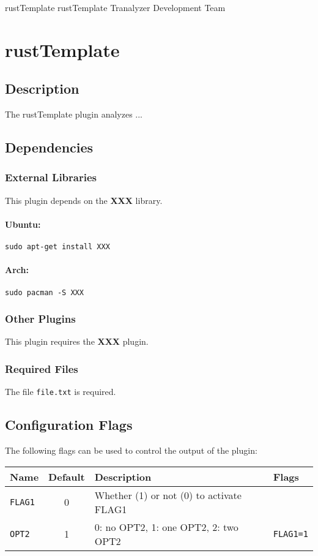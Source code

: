 \documentclass[documentation]{subfiles}
\begin{document}
\trantitle
    {rustTemplate} %
    {rustTemplate} %
    {Tranalyzer Development Team} %

\section{rustTemplate}\label{s:rustTemplate}

\subsection{Description}
The rustTemplate plugin analyzes ...

\subsection{Dependencies}



\subsubsection{External Libraries}
This plugin depends on the {\bf XXX} library.
\paragraph{Ubuntu:} {\tt sudo apt-get install XXX}
\paragraph{Arch:} {\tt sudo pacman -S XXX}

\subsubsection{Other Plugins}
This plugin requires the {\bf XXX} plugin.

\subsubsection{Required Files}
The file {\tt file.txt} is required.

\subsection{Configuration Flags}
The following flags can be used to control the output of the plugin:
\begin{longtable}{lcll}
    {\bf Name} & {\bf Default} & {\bf Description} & {\bf Flags}\\
    \hline\endhead
    {\tt FLAG1} & 0 & Whether (1) or not (0) to activate FLAG1\\
    {\tt OPT2} & 1 & 0: no OPT2, 1: one OPT2, 2: two OPT2 & {\tt FLAG1=1}\\
\end{longtable}
\end{document}

